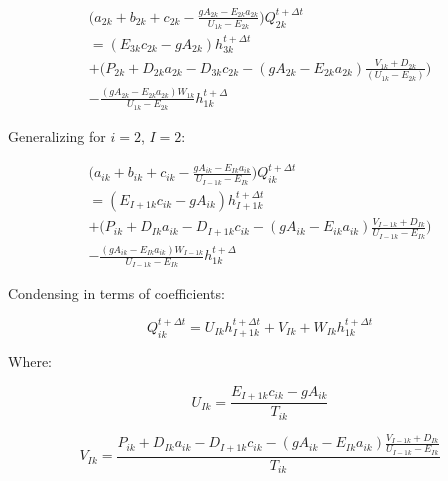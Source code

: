 \documentclass[11pt]{article}
\begin{document}
\begin{equation}
  \begin{split}
    \biggl( a_{2k} + b_{2k} + c_{2k} - \frac{g A_{2k} - E_{2k} a_{2k}}{U_{1k} - E_{2k}} \biggr)  Q_{2k}^{t + \Delta t} \\ =  ( E_{3k} c_{2k} - g A_{2k}) h_{3k}^{t + \Delta t}   
   \\ + \biggl( P_{2k} + D_{2k} a_{2k}   - D_{3k} c_{2k} - (g A_{2k} - E_{2k} a_{2k}) \frac{ V_{1k} + D_{2k} }{( U_{1k} - E_{2k} )} \biggr) \\ - \frac{(g A_{2k} - E_{2k} a_{2k}) W_{1k} }{U_{1k} - E_{2k}} h_{1k}^{t + \Delta} 
  \end{split}
\end{equation}

Generalizing for $i = 2$, $I = 2$:

\begin{equation}
  \begin{split}
    \biggl( a_{ik} + b_{ik} + c_{ik} - \frac{g A_{ik} - E_{Ik} a_{ik}}{U_{I - 1k} - E_{Ik}} \biggr)  Q_{ik}^{t + \Delta t} \\ =  ( E_{I + 1k} c_{ik} - g A_{ik}) h_{I + 1k}^{t + \Delta t}   
   \\ + \biggl( P_{ik} + D_{Ik} a_{ik}   - D_{I+1k} c_{ik} - (g A_{ik} - E_{ik} a_{ik}) \frac{ V_{I-1k} + D_{Ik} }{ U_{I-1k} - E_{Ik} } \biggr) \\ - \frac{(g A_{ik} - E_{Ik} a_{ik}) W_{I - 1k} }{U_{I - 1k} - E_{Ik}} h_{1k}^{t + \Delta} 
  \end{split}
\end{equation}

Condensing in terms of coefficients:

\begin{equation}
  \boxed{
 Q_{ik}^{t + \Delta t} = U_{Ik} h_{I + 1k}^{t + \Delta t} + V_{Ik} + W_{Ik} h_{1k}^{t + \Delta t} 
 }
\end{equation}

Where:

\begin{equation}
  \boxed{
    U_{Ik} = \frac{E_{I + 1k} c_{ik} - g A_{ik}}{T_{ik}}
 }
\end{equation}

\begin{equation}
  \boxed{
    V_{Ik} = \frac{ P_{ik} + D_{Ik} a_{ik} - D_{I + 1k} c_{ik} - (g A_{ik} - E_{Ik} a_{ik}) \frac{ V_{I-1k} + D_{Ik} }{ U_{I-1k} - E_{Ik} }}{T_{ik}}
 }
\end{equation}
\end{document}
